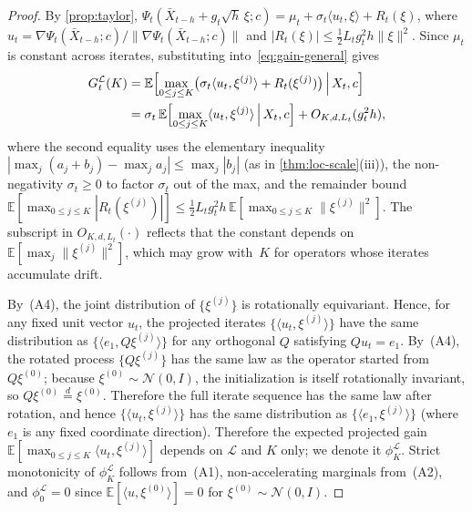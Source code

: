 \begin{proof}
By \cref{prop:taylor},
$\Psi_t(\bar{X}_{t-h}+g_t\sqrt{h}\,\xi;c)
=\mu_t+\sigma_t\langle u_t,\xi\rangle+R_t(\xi)$,
where $u_t=\nabla\Psi_t(\bar{X}_{t-h};c)/\|\nabla\Psi_t(\bar{X}_{t-h};c)\|$
and $|R_t(\xi)|\le\tfrac{1}{2}L_t g_t^2 h\|\xi\|^2$.
Since $\mu_t$ is constant across iterates, substituting
into~\eqref{eq:gain-general} gives
\begin{align*}
  G_t^{\mathcal{L}}(K)
  &= \mathbb{E}\Bigl[
       \max_{0\le j\le K}
       \bigl(\sigma_t\langle u_t,\xi^{(j)}\rangle + R_t(\xi^{(j)})\bigr)
     \,\Big|\,X_t,c\Bigr] \\
  &= \sigma_t\,\mathbb{E}\Bigl[
       \max_{0\le j\le K}\langle u_t,\xi^{(j)}\rangle
     \,\Big|\,X_t,c\Bigr]
     + O_{K,d,L_t}(g_t^2 h),
\end{align*}
where the second equality uses the elementary inequality
$|\max_j(a_j+b_j)-\max_j a_j|\le\max_j|b_j|$
(as in \cref{thm:loc-scale}(iii)), the non-negativity $\sigma_t\ge 0$
to factor $\sigma_t$ out of the max, and the remainder bound
$\mathbb{E}[\max_{0\le j\le K}|R_t(\xi^{(j)})|]
\le\tfrac{1}{2}L_t g_t^2 h\,\mathbb{E}[\max_{0\le j\le K}\|\xi^{(j)}\|^2]$.
The subscript in $O_{K,d,L_t}(\cdot)$ reflects that the constant depends on
$\mathbb{E}[\max_j\|\xi^{(j)}\|^2]$, which may grow with~$K$ for
operators whose iterates accumulate drift.

By~(A4), the joint distribution of $\{\xi^{(j)}\}$ is rotationally
equivariant.
Hence, for any fixed unit vector $u_t$, the projected iterates
$\{\langle u_t,\xi^{(j)}\rangle\}$ have the same distribution as
$\{\langle e_1,Q\xi^{(j)}\rangle\}$ for any orthogonal $Q$ satisfying
$Qu_t=e_1$.
By~(A4), the rotated process $\{Q\xi^{(j)}\}$ has the same law as the
operator started from $Q\xi^{(0)}$; because
$\xi^{(0)}\sim\mathcal{N}(0,I)$, the initialization is itself
rotationally invariant, so $Q\xi^{(0)}\stackrel{d}{=}\xi^{(0)}$.
Therefore the full iterate sequence has the same law after rotation, and
hence $\{\langle u_t,\xi^{(j)}\rangle\}$ has the same distribution as
$\{\langle e_1,\xi^{(j)}\rangle\}$ (where $e_1$ is any fixed
coordinate direction).
Therefore the expected projected gain
$\mathbb{E}[\max_{0\le j\le K}\langle u_t,\xi^{(j)}\rangle]$
depends on $\mathcal{L}$ and $K$ only; we denote it
$\phi_K^{\mathcal{L}}$.
Strict monotonicity of $\phi_K^{\mathcal{L}}$
follows from~(A1), non-accelerating marginals from~(A2),
and $\phi_0^{\mathcal{L}}=0$ since
$\mathbb{E}[\langle u,\xi^{(0)}\rangle]=0$ for
$\xi^{(0)}\sim\mathcal{N}(0,I)$.
\end{proof}

